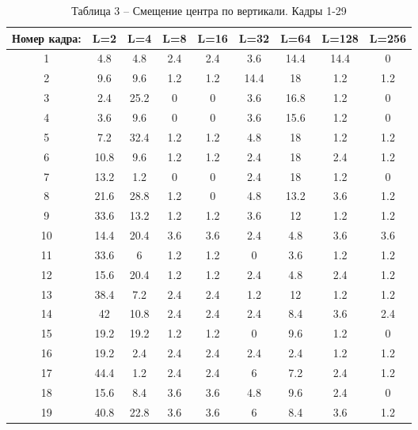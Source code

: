 \begin{table}[h!]
\caption*{Таблица 3 -- Смещение центра по вертикали. Кадры 1-29}
\begin{tabular}{|c|c|c|c|c|c|c|c|c|}
\hline
Номер кадра: & L=2   & L=4  & L=8  & L=16  & L=32  & L=64  & L=128 & L=256 \\ \hline
1            & 4.8   & 4.8  & 2.4  & 2.4   & 3.6   & 14.4  & 14.4  & 0     \\ \hline
2            & 9.6   & 9.6  & 1.2  & 1.2   & 14.4  & 18    & 1.2   & 1.2   \\ \hline
3            & 2.4   & 25.2 & 0    & 0     & 3.6   & 16.8  & 1.2   & 0     \\ \hline
4            & 3.6   & 9.6  & 0    & 0     & 3.6   & 15.6  & 1.2   & 0     \\ \hline
5            & 7.2   & 32.4 & 1.2  & 1.2   & 4.8   & 18    & 1.2   & 1.2   \\ \hline
6            & 10.8  & 9.6  & 1.2  & 1.2   & 2.4   & 18    & 2.4   & 1.2   \\ \hline
7            & 13.2  & 1.2  & 0    & 0     & 2.4   & 18    & 1.2   & 0     \\ \hline
8            & 21.6  & 28.8 & 1.2  & 0     & 4.8   & 13.2  & 3.6   & 1.2   \\ \hline
9            & 33.6  & 13.2 & 1.2  & 1.2   & 3.6   & 12    & 1.2   & 1.2   \\ \hline
10           & 14.4  & 20.4 & 3.6  & 3.6   & 2.4   & 4.8   & 3.6   & 3.6   \\ \hline
11           & 33.6  & 6    & 1.2  & 1.2   & 0     & 3.6   & 1.2   & 1.2   \\ \hline
12           & 15.6  & 20.4 & 1.2  & 1.2   & 2.4   & 4.8   & 2.4   & 1.2   \\ \hline
13           & 38.4  & 7.2  & 2.4  & 2.4   & 1.2   & 12    & 1.2   & 1.2   \\ \hline
14           & 42    & 10.8 & 2.4  & 2.4   & 2.4   & 8.4   & 3.6   & 2.4   \\ \hline
15           & 19.2  & 19.2 & 1.2  & 1.2   & 0     & 9.6   & 1.2   & 0     \\ \hline
16           & 19.2  & 2.4  & 2.4  & 2.4   & 2.4   & 2.4   & 1.2   & 1.2   \\ \hline
17           & 44.4  & 1.2  & 2.4  & 2.4   & 6     & 7.2   & 2.4   & 1.2   \\ \hline
18           & 15.6  & 8.4  & 3.6  & 3.6   & 4.8   & 9.6   & 2.4   & 0     \\ \hline
19           & 40.8  & 22.8 & 3.6  & 3.6   & 6     & 8.4   & 3.6   & 1.2   \\ \hline

\end{tabular}
\end{table}
